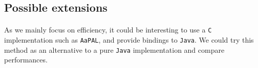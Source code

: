 \documentclass[letterpaper]{article}
\theoremstyle{definition}
\begin{document}

\subsection{Possible extensions}

\paragraph{}

As we mainly focus on efficiency, it could be interesting to use a \texttt{C}
implementation such as \texttt{AaPAL},
and provide bindings to \texttt{Java}. We could try
this method as an alternative to a pure \texttt{Java} implementation and
compare performances.





\end{document}
